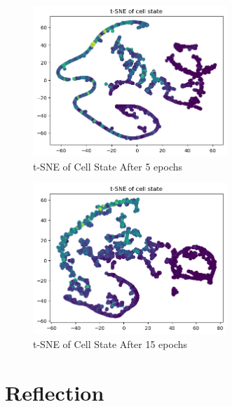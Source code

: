 \documentclass[12pt, twoside]{report}
\begin{document}
\begin{figure}[H]
    \centering
    \includegraphics[width=0.65\textwidth]{figures/cell state evolution/5 epoch.png}
    \caption*{t-SNE of Cell State After 5 epochs}
\end{figure}

\begin{figure}[H]
    \centering
    \includegraphics[width=0.65\textwidth]{figures/cell state evolution/15 epoch.png}
    \caption*{t-SNE of Cell State After 15 epochs}
\end{figure}


\chapter{Reflection}




\end{document}

